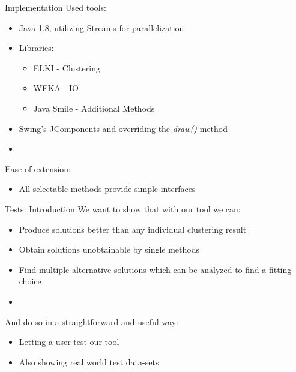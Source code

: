 \documentclass[aspectratio=169]{beamer}
\begin{document}
\begin{frame}{Implementation}
Used tools:
	\begin{itemize}
		\item Java 1.8, utilizing Streams for parallelization
		\item Libraries:
		\begin{itemize}
			\item  ELKI \cite{10.1007/978-3-540-69497-7_41} - Clustering
			\item WEKA \cite{10.1145/1656274.1656278} - IO
			\item Java Smile \cite{javasmile} - Additional Methods
		\end{itemize}
		\item Swing's JComponents and overriding the \emph{draw()} method
		\item[]
	\end{itemize}
Ease of extension:
	\begin{itemize}
		\item All selectable methods provide simple interfaces
	\end{itemize}
\end{frame}


\begin{frame}{Tests: Introduction}
We want to show that with our tool we can:

	\begin{itemize}
		\item Produce solutions better than any individual clustering result
		\item Obtain solutions unobtainable by single methods
		\item Find multiple alternative solutions which can be analyzed to find a fitting choice
		\item[]
	\end{itemize}

And do so in a straightforward and useful way:
	\begin{itemize}
		\item Letting a user test our tool
		\item Also showing real world test data-sets
	\end{itemize}
\end{frame}
\end{document}
